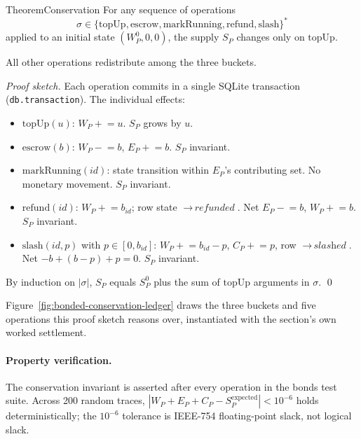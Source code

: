 \documentclass[11pt,a4paper]{article}
\theoremstyle{definition}
\theoremstyle{remark}
\begin{document}
\begin{pdclaim}{Theorem}{Conservation}
\setlength{\parskip}{4pt plus 1pt}
\label{thm:conservation}
For any sequence of operations
\[
\sigma \in \bigl\{\mathrm{topUp},\mathrm{escrow},\mathrm{markRunning},
\mathrm{refund},\mathrm{slash}\bigr\}^{*}
\]
applied to an initial state $(W_P^{0}, 0, 0)$, the supply $S_P$ changes only on $\mathrm{topUp}$. 

All other operations redistribute among the three buckets.
\end{pdclaim}

\begin{proof}[Proof sketch]
\setlength{\parskip}{4pt plus 1pt}
Each operation commits in a single SQLite transaction (\texttt{db.transaction}). The individual effects:
\begin{itemize}[nosep]
  \item $\mathrm{topUp}(u)$: $W_P\mathrel{+}=u$. $S_P$ grows by $u$.
  \item $\mathrm{escrow}(b)$: $W_P\mathrel{-}=b$, $E_P\mathrel{+}=b$. $S_P$ invariant.
  \item $\mathrm{markRunning}(\mathit{id})$: state transition within $E_P$'s contributing set. No monetary movement. $S_P$ invariant.
  \item $\mathrm{refund}(\mathit{id})$: $W_P\mathrel{+}=b_{\mathit{id}}$; row state $\to\,\textit{refunded}$. Net $E_P\mathrel{-}=b$, $W_P\mathrel{+}=b$. $S_P$ invariant.
  \item $\mathrm{slash}(\mathit{id}, p)$ with $p\in[0, b_{\mathit{id}}]$: $W_P\mathrel{+}=b_{\mathit{id}}-p$, $C_P\mathrel{+}=p$, row $\to\,\textit{slashed}$. Net $-b + (b-p) + p = 0$. $S_P$ invariant.
\end{itemize}
By induction on $|\sigma|$, $S_P$ equals $S_P^{0}$ plus the sum of $\mathrm{topUp}$ arguments in $\sigma$. \qed
\end{proof}

Figure~\ref{fig:bonded-conservation-ledger} draws the three buckets and five operations this proof sketch reasons over, instantiated with the section's own worked settlement.



\paragraph{Property verification.} The conservation invariant is asserted after every operation in the bonds test suite. Across 200 random traces, $|W_P + E_P + C_P - S_P^{\text{expected}}| < 10^{-6}$ holds deterministically; the $10^{-6}$ tolerance is IEEE-754 floating-point slack, not logical slack.
\end{document}
